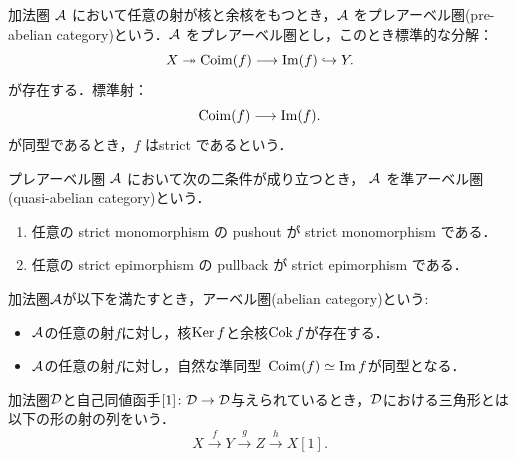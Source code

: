 \begin{defn}
加法圏 ${\mathcal A}$ において任意の射が核と余核をもつとき，${\mathcal A}$ をプレアーベル圏(pre-abelian category)という．${\mathcal A}$ をプレアーベル圏とし，このとき標準的な分解：
\[
X\twoheadrightarrow \operatorname{\mathrm{Coim}}(f)
\longrightarrow
\Im(f)
\hookrightarrow Y.
\]
が存在する．標準射：
\[
\operatorname{\mathrm{Coim}}(f)\longrightarrow\Im(f).
\]
が同型であるとき，$f$ はstrict であるという．

プレアーベル圏 ${\mathcal A}$ において次の二条件が成り立つとき，
${\mathcal A}$ を準アーベル圏(quasi-abelian category)という．
\begin{enumerate}
    \item 任意の strict monomorphism の pushout が
    strict monomorphism である．
    \item 任意の strict epimorphism の pullback が
    strict epimorphism である．
\end{enumerate}
\end{defn}

\begin{defn}\cite[p.175]{KS06}
	加法圏${\mathcal A}$が以下を満たすとき，アーベル圏(abelian category)という:
	\vspace{-3mm}
	\begin{itemize}
		\item[(i)]
			${\mathcal A}$の任意の射$f$に対し，核$\operatorname{Ker} f$と余核$\operatorname{Cok} f$が存在する．
		\item[(ii)]
			${\mathcal A}$の任意の射$f$に対し，自然な準同型\ $\operatorname{\mathrm{Coim}}(f)\simeq\Im f$が同型となる．
	\end{itemize}
\end{defn}

\begin{defn}
	
\end{defn}
	加法圏${\mathcal D}$と自己同値函手$[1]\colon{\mathcal D}\to{\mathcal D}$与えられているとき，${\mathcal D}$における三角形とは以下の形の射の列をいう．
	\[X\xrightarrow{f}Y\xrightarrow{g} Z\xrightarrow{h} X[1].\]

